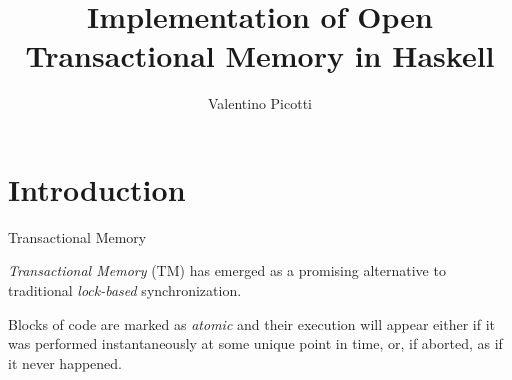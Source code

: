 \documentclass[beamer={noamsthm,10pt},target=bach]{thud}[2014/03/11]
\title{Implementation of Open Transactional Memory in Haskell}
\author{Valentino Picotti}
\begin{document}
\maketitle

\section{Introduction}

\begin{frame}{Transactional Memory}


\emph{Transactional Memory} (TM) has emerged as a promising alternative to traditional \emph{lock-based} synchronization.

Blocks of code are marked as \emph{atomic} and their execution will appear either if it was performed instantaneously at some unique point in time, or, if aborted, as if it never happened.
\end{frame}

\end{document}
